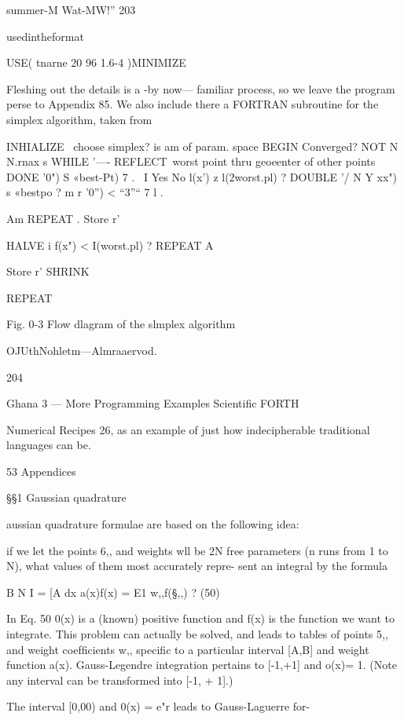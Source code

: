 {{summer-M Wat-MW!” 203

usedintheformat

USE( tnarne 20 96 1.6-4 )MINIMIZE

Fleshing out the details is a -by now— familiar process, so we
leave the program perse to Appendix 85. We also include there
a FORTRAN subroutine for the simplex algorithm, taken from

 

 

 

INHIALIZE \ choose simplex? is am of param. space
BEGIN
Converged? NOT N N.rnax s
WHILE
'—- REFLECT\ worst point thru geoeenter of other points
DONE '0") S «best-Pt) 7
.~
I
Yes No l(x') z l(2worst.pl) ?
DOUBLE '/\’
N Y
xx") s «bestpo ? m r ’0”) < “3”“ 7
l .

Am REPEAT .
Store r'

HALVE
i
f(x") < I(worst.pl) ?
REPEAT A

Store r' SHRINK

REPEAT

 

 

Fig. 0-3 Flow dlagram of the slmplex algorithm

OJUthNohletm—Almraaervod.

204

Ghana 3 — More Programming Examples Scientiﬁc FORTH

Numerical Recipes 26, as an example of just how indecipherable
traditional languages can be.

53 Appendices

§§1 Gaussian quadrature

aussian quadrature formulae are based on the following idea:

if we let the points 6,, and weights wll be 2N free parameters
(n runs from 1 to N), what values of them most accurately repre-
sent an integral by the formula

B N
I = [A dx a(x)f(x) = E1 w,,f(§,,) ? (50)

In Eq. 50 0(x) is a (known) positive function and f(x) is the
function we want to integrate. This problem can actually be
solved, and leads to tables of points 5,, and weight coefﬁcients
w,, speciﬁc to a particular interval [A,B] and weight function a(x).
Gauss-Legendre integration pertains to [-1,+1] and o(x)= 1.
(Note any interval can be transformed into [-1, + 1].)

The interval [0,00) and 0(x) = e"r leads to Gauss-Laguerre for-

}}
